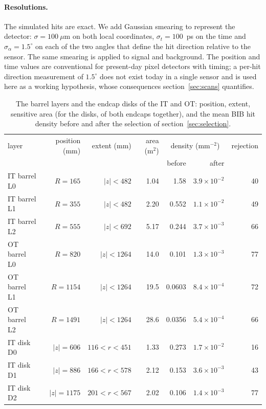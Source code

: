 \IfFileExists{jinst.cls}{\documentclass[a4paper,11pt]{jinst}}
\begin{document}
\paragraph{Resolutions.} The simulated hits are exact. We add Gaussian smearing to represent the
detector: $\sigma=100~\mu$m on both local coordinates, $\sigma_t=100$~ps on the time and
$\sigma_\alpha=1.5^\circ$ on each of the two angles that define the hit direction relative to the
sensor. The same smearing is applied to signal and background. The position and time values are
conventional for present-day pixel detectors with timing; a per-hit direction measurement of
$1.5^\circ$ does not exist today in a single sensor and is used here as a working hypothesis, whose
consequences section~\ref{sec:scans} quantifies.

\begin{table}[htbp]
  \centering
  \caption{The barrel layers and the endcap disks of the IT and OT: position, extent, sensitive area
  (for the disks, of both endcaps together), and the mean BIB hit density before and after the
  selection of section~\ref{sec:selection}.}
  \label{tab:layers}
  \small
  \begin{tabular}{lrrrrrr}
    \toprule
    layer & position (mm) & extent (mm) & area (m$^2$) & \multicolumn{2}{c}{density (mm$^{-2}$)} & rejection \\
          &               &             &              & before & after & \\
    \midrule
    IT barrel L0 & $R=165$  & $|z|<482$  & 1.04 & 1.58   & $3.9\times10^{-2}$ & 40 \\
    IT barrel L1 & $R=355$  & $|z|<482$  & 2.20 & 0.552  & $1.1\times10^{-2}$ & 49 \\
    IT barrel L2 & $R=555$  & $|z|<692$  & 5.17 & 0.244  & $3.7\times10^{-3}$ & 66 \\
    OT barrel L0 & $R=820$  & $|z|<1264$ & 14.0 & 0.101  & $1.3\times10^{-3}$ & 77 \\
    OT barrel L1 & $R=1154$ & $|z|<1264$ & 19.5 & 0.0603 & $8.4\times10^{-4}$ & 72 \\
    OT barrel L2 & $R=1491$ & $|z|<1264$ & 28.6 & 0.0356 & $5.4\times10^{-4}$ & 66 \\
    \midrule
    IT disk D0 & $|z|=606$  & $116<r<451$ & 1.33 & 0.273  & $1.7\times10^{-2}$ & 16 \\
    IT disk D1 & $|z|=886$  & $166<r<578$ & 2.12 & 0.153  & $3.6\times10^{-3}$ & 43 \\
    IT disk D2 & $|z|=1175$ & $201<r<567$ & 2.02 & 0.106  & $1.4\times10^{-3}$ & 77 \\

\end{tabular}
\end{table}
\end{document}
